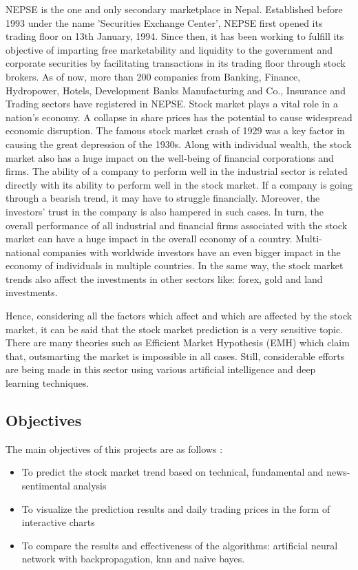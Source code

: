 \cite{sto} NEPSE is the one and only secondary marketplace in Nepal. Established before 1993 under the name 'Securities Exchange Center', NEPSE first opened its trading floor on 13th January, 1994. Since then, it has been working to fulfill its objective of imparting free marketability and liquidity to the government and corporate securities by facilitating transactions in its trading floor through stock brokers. As of now, more than 200 companies from Banking, Finance, Hydropower, Hotels, Development Banks Manufacturing and Co., Insurance and Trading sectors have registered in NEPSE. Stock market plays a vital role in a nation's economy. \cite{eco} A collapse in share prices has the potential to cause widespread economic disruption. The famous stock market crash of 1929 was a key factor in causing the great depression of the 1930s. Along with individual wealth, the stock market also has a huge impact on the well-being of financial corporations and firms. The ability of a company to perform well in the industrial sector is related directly with its ability to perform well in the stock market. If a company is going through a bearish trend, it may have to struggle financially. Moreover, the investors' trust in the company is also hampered in such cases. In turn, the overall performance of all industrial and financial firms associated with the stock market can have a huge impact in the overall economy of a country. Multi-national companies with worldwide investors have an even bigger impact in the economy of individuals in multiple countries. In the same way, the stock market trends also affect the investments in other sectors like: forex, gold and land investments.  

Hence, considering all the factors which affect and which are affected by the stock market, it can be said that the stock market prediction is a very sensitive topic. There are many theories such as Efficient Market Hypothesis (EMH) which claim that, outsmarting the market is impossible in all cases. Still, considerable efforts are being made in this sector using various artificial intelligence and deep learning techniques. 

\subsection{Objectives}
The main objectives of this projects are as follows :
\begin{itemize}
	\item To predict the stock market trend based on technical, fundamental and news-sentimental analysis
 	\item To visualize the prediction results and daily trading prices in the form of interactive charts
	\item To compare the results and effectiveness of the algorithms: artificial neural network with backpropagation, knn and naive bayes.
\end{itemize}

